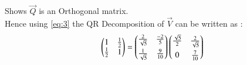 \documentclass[journal,12pt,twocolumn]{IEEEtran}
\begin{document}
Shows $\vec{Q}$ is an Orthogonal matrix.\\

Hence using \eqref{eq:3} the QR Decomposition of $\vec{V}$ can be written as :
\begin{align}
\begin{pmatrix}1&\frac{1}{2}\\\frac{1}{2}&1\end{pmatrix}=\begin{pmatrix}\frac{2}{\sqrt{5}}&\frac{-2}{5}\\[0.2cm]\frac{1}{\sqrt{5}}&\frac{9}{10}\end{pmatrix}\begin{pmatrix}\frac{\sqrt{5}}{2}&\frac{2}{\sqrt{5}}\\[0.2cm]0&\frac{7}{10}\end{pmatrix}
\end{align}
\end{document}
